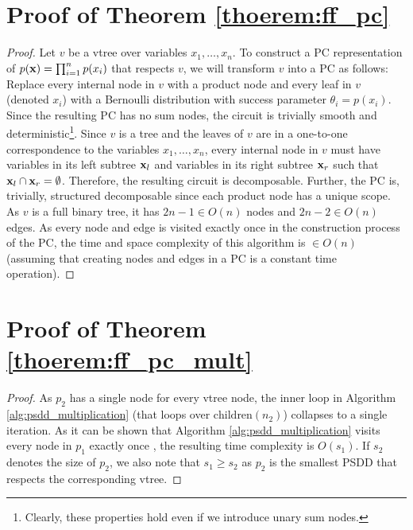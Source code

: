 \section{Proof of Theorem \ref{thoerem:ff_pc}}
\label{app:ff_pc}
\begin{proof}
Let $v$ be a vtree over variables $x_1,\dots,x_n$. To construct a PC representation of $p(\mathbf{x}) = \prod_{i=1}^n p(x_i)$ that respects $v$, we will transform $v$ into a PC as follows: Replace every internal node in $v$ with a product node and every leaf in $v$ (denoted $x_i$) with a Bernoulli distribution with success parameter $\theta_i = p(x_i)$. Since the resulting PC has no sum nodes, the circuit is trivially smooth and deterministic\footnote{Clearly, these properties hold even if we introduce unary sum nodes.}. Since $v$ is a tree and the leaves of $v$ are in a one-to-one correspondence to the variables $x_1,\dots,x_n$, every internal node in $v$ must have variables in its left subtree $\mathbf{x}_l$ and variables in its right subtree $\mathbf{x}_r$ such that $\mathbf{x}_l \cap \mathbf{x}_r = \emptyset$. Therefore, the resulting circuit is decomposable. Further, the PC is, trivially, structured decomposable since each product node has a unique scope. As $v$ is a full binary tree, it has $2n - 1 \in O(n)$ nodes and $2n - 2 \in O(n)$ edges. As every node and edge is visited exactly once in the construction process of the PC, the time and space complexity of this algorithm is $\in O(n)$ (assuming that creating nodes and edges in a PC is a constant time operation).
\end{proof}

\section{Proof of Theorem \ref{thoerem:ff_pc_mult}}
\label{app:ff_pc_mult}
\begin{proof}
As $p_2$ has a single node for every vtree node, the inner loop in Algorithm \ref{alg:psdd_multiplication} (that loops over $\text{children}(n_2)$) collapses to a single iteration. As it can be shown that Algorithm \ref{alg:psdd_multiplication} visits every node in $p_1$ exactly once \cite{tractable_ops}, the resulting time complexity is $O(s_1)$. If $s_2$ denotes the size of $p_2$, we also note that $s_1 \geq s_2$ as $p_2$ is the smallest PSDD that respects the corresponding vtree.
\end{proof}